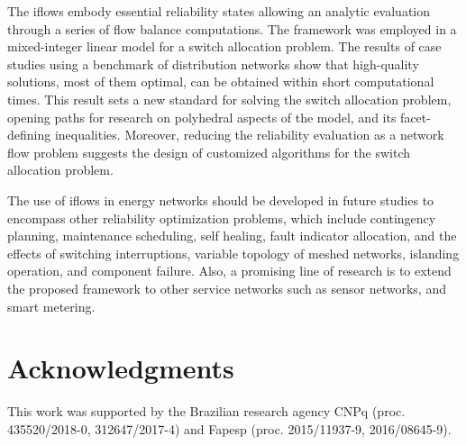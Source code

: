 \documentclass{article}
\begin{document}
The iflows embody essential reliability states allowing an analytic evaluation through a series of flow balance computations.
The framework was employed in a mixed-integer linear model for a switch allocation problem. 
The results of case studies using a benchmark of distribution networks show 
that high-quality solutions, most of them optimal, can be  obtained within
short computational times. This result sets a new standard for solving the switch allocation problem, opening  paths for research on polyhedral aspects of the model, and its facet-defining inequalities. Moreover, reducing the reliability evaluation as a network flow problem suggests the design of customized algorithms for the switch allocation problem.


The use of iflows in energy
networks should be developed in future studies to encompass other reliability optimization problems, which include contingency planning, maintenance scheduling, self healing, fault indicator allocation, and the effects of switching interruptions, variable topology of meshed networks, islanding operation, and component failure. 
Also, a promising line of research is to extend the proposed framework to other service networks such as sensor networks, and smart metering.



\section*{Acknowledgments}
This work was supported by the Brazilian research agency CNPq (proc. 435520/2018-0, 312647/2017-4) and Fapesp (proc. 2015/11937-9, 2016/08645-9).



\end{document}

